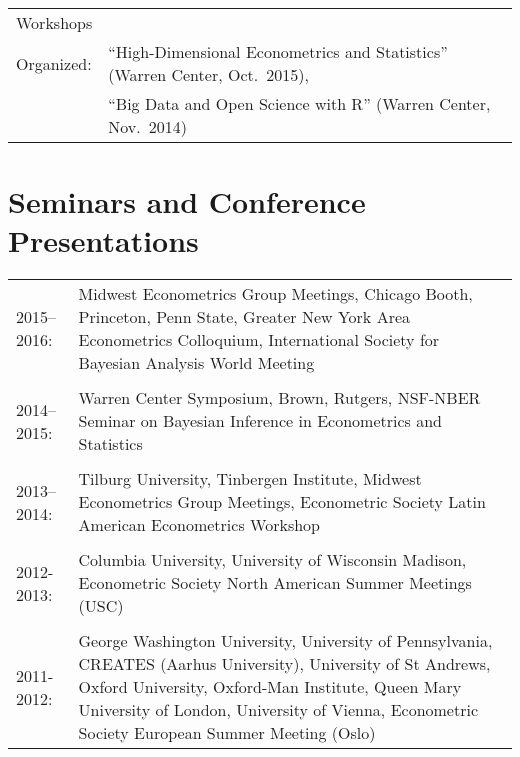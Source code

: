 \documentclass[line,overlapped]{myres}
\begin{document}
\begin{resume}
\begin{tabular}{p{2cm}p{12cm}}
Workshops \\Organized: &``High-Dimensional Econometrics and Statistics'' (Warren Center, Oct.\ 2015),\\
& ``Big Data and Open Science with R'' (Warren Center, Nov.\ 2014)
\end{tabular}


\section{\sc Seminars and Conference Presentations}
\vspace{1em}

\begin{tabular}{p{2cm}p{12cm}}
2015--2016: & Midwest Econometrics Group Meetings, Chicago Booth, Princeton, Penn State, Greater New York Area Econometrics Colloquium, International Society for Bayesian Analysis World Meeting\\ \\
2014--2015: & Warren Center Symposium, Brown, Rutgers, NSF-NBER Seminar on Bayesian Inference in Econometrics and Statistics \\ \\
2013--2014: & Tilburg University, Tinbergen Institute, Midwest Econometrics Group Meetings, Econometric Society Latin American Econometrics Workshop\\ \\
2012-2013: & Columbia University, University of Wisconsin Madison, Econometric Society North American Summer Meetings (USC) \\\\
2011-2012: &  George Washington University, University of Pennsylvania, CREATES (Aarhus University), University of St Andrews, Oxford University, Oxford-Man Institute, Queen Mary University of London, University of Vienna, Econometric Society European Summer Meeting (Oslo)

\end{tabular}



\end{resume}
\end{document}
